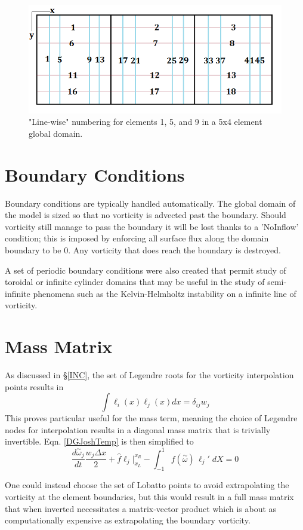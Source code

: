 \documentclass[letterpaper,12pt]{report}
\newcommand{\be}{\begin{equation}}
\newcommand{\ben}[1]{\begin{equation}\label{#1}}
\newcommand{\ee}{\end{equation}}
\newcommand{\aomega}{\overset{\sim}{\omega}}				%
\begin{document}
\begin{figure}
\centering
\includegraphics[width=5.5in]{streams.PNG}
\caption{\label{fig:streams}"Line-wise" numbering for elements 1, 5, and 9 in a 5x4 element global domain.}
\end{figure}

%
\section{Boundary Conditions}
Boundary conditions are typically handled automatically. The global domain of the model is sized so that no vorticity is advected past the boundary. Should vorticity still manage to pass the boundary it will be lost thanks to a 'NoInflow' condition; this is imposed by enforcing all surface flux along the domain boundary to be 0. Any vorticity that does reach the boundary is destroyed.

A set of periodic boundary conditions were also created that permit study of toroidal or infinite cylinder domains that may be useful in the study of semi-infinite phenomena such as the Kelvin-Helmholtz instability on a infinite line of vorticity.

%
\section{Mass Matrix}\label{MassM}
As discussed in \S\ref{INC}, the set of Legendre roots for the vorticity interpolation points results in
\be \int \ell_i(x) \ell_j(x) dx = \delta_{ij} w_j \ee
This proves particular useful for the mass term, meaning the choice of Legendre nodes for interpolation results in a diagonal mass matrix that is trivially invertible. Eqn. \eqref{DGJoshTemp} is then simplified to
\ben{DGJoshTemp2} \frac{d \aomega_j}{dt} \frac{w_j \Delta x}{2}
+\hat{f}\ell_j \Big|^{x_R}_{x_L} 
- \int_{-1}^{1} f(\aomega) \, \ell_j' \;dX = 0 \ee

One could instead choose the set of Lobatto points to avoid extrapolating the vorticity at the element boundaries, but this would result in a full mass matrix that when inverted necessitates a matrix-vector product which is about as computationally expensive as extrapolating the boundary vorticity.
\end{document}
